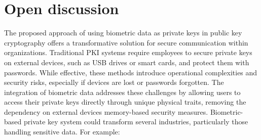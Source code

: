 \documentclass[graybox]{svmult}
\begin{document}
\section{Open discussion}
The proposed approach of using biometric data as private keys in public key cryptography offers a transformative solution for secure communication within organizations. Traditional PKI systems require employees to secure private keys on external devices, such as USB drives or smart cards, and protect them with passwords. While effective, these methods introduce operational complexities and security risks, especially if devices are lost or passwords forgotten. The integration of biometric data addresses these challenges by allowing users to access their private keys directly through unique physical traits, removing the dependency on external devices memory-based security measures. Biometric-based private key system could transform several industries, particularly those handling sensitive data. For example:
\end{document}
